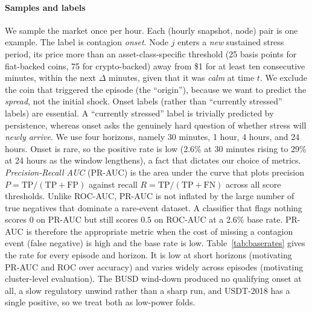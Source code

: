 \documentclass[sigconf,anonymous]{acmart}
\begin{document}
\paragraph{Samples and labels} We sample the market once per hour. Each (hourly snapshot, node)
pair is one example. The label is contagion \emph{onset}. Node $j$ enters a \emph{new} sustained
stress period, its price more than an asset-class-specific threshold (25 basis points for
fiat-backed coins, 75 for crypto-backed) away from \$1 for at least ten consecutive minutes, within the next $\Delta$ minutes, given that it was \emph{calm} at time $t$. We exclude the coin
that triggered the episode (the ``origin''), because we want to predict the \emph{spread}, not the
initial shock. Onset labels (rather than ``currently stressed'' labels) are essential. A
``currently stressed'' label is trivially predicted by persistence, whereas onset asks the genuinely
hard question of whether stress will \emph{newly arrive}. We use four horizons, namely 30 minutes, 1 hour,
4 hours, and 24 hours. Onset is rare, so the positive rate is low (2.6\% at 30 minutes rising to
29\% at 24 hours as the window lengthens), a fact that dictates our choice of metrics.
\emph{Precision-Recall AUC} (PR-AUC) is the area under the curve that plots
precision $P = \mathrm{TP}/(\mathrm{TP}+\mathrm{FP})$ against recall
$R = \mathrm{TP}/(\mathrm{TP}+\mathrm{FN})$ across all score thresholds.
Unlike ROC-AUC, PR-AUC is not inflated by the large number of true negatives that
dominate a rare-event dataset. A classifier that flags nothing scores $0$ on PR-AUC
but still scores $0.5$ on ROC-AUC at a 2.6\% base rate.  PR-AUC is therefore the
appropriate metric when the cost of missing a contagion event (false negative) is high
and the base rate is low.
Table~\ref{tab:baserates} gives the rate for every episode and horizon. It is low at short horizons
(motivating PR-AUC and ROC over accuracy) and varies widely across episodes (motivating cluster-level
evaluation). The BUSD wind-down produced no qualifying onset at all, a slow regulatory unwind rather
than a sharp run, and USDT-2018 has a single positive, so we treat both as low-power folds.
\end{document}
